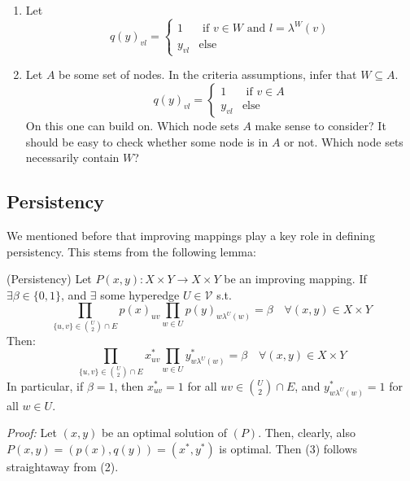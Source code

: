 \begin{enumerate}
\begin{enumerate}
        \item Let 
            \begin{equation} q(y)_{vl}= \begin{cases}
            1 & \text{ if } v \in W \text{ and } l=\lambda^W(v) \\
            y_{vl} & \text{else}
            \end{cases}
            \end{equation}
        
        \item Let $A$ be some set of nodes. In the criteria assumptions, infer that $W \subseteq A$. 
        \begin{equation} q(y)_{vl}= \begin{cases}
            1 & \text{ if } v \in A \\
            y_{vl} & \text{else}
            \end{cases}
            \end{equation}
        On this one can build on. Which node sets $A$ make sense to consider? It should be easy to check whether some node is in $A$ or not. Which node sets necessarily contain $W$? 
    \end{enumerate}
\end{enumerate}

\subsection{Persistency}
We mentioned before that improving mappings play a key role in defining persistency. This stems from the following lemma: 
\begin{lemma}{(Persistency)}
Let $P(x,y): X \times Y \to X \times Y$ be an improving mapping. If $\exists \beta \in \{0,1\}$, and $\exists$ some hyperedge $U \in \mathcal{V}$ s.t. 
\begin{equation}
    \prod_{\{u,v\} \in \binom{U}{2} \cap E} p(x)_{uv} \prod_{w \in U} p(y)_{w \lambda^U(w)}= \beta \quad \forall (x,y) \in X \times Y
\end{equation}
Then: 
\begin{equation}
    \prod_{\{u,v\} \in \binom{U}{2} \cap E} x^*_{uv} \prod_{w \in U} y^*_{w \lambda^U(w)}= \beta \quad \forall (x,y) \in X \times Y
\end{equation} In particular, if $\beta=1$, then $x^*_{uv}=1$ for all $uv \in \binom{U}{2} \cap E$, and $y^*_{w \lambda^U(w)}=1$ for all $w \in U$.  \end{lemma} \textit{Proof:} Let $(x,y)$ be an optimal solution of $(P)$. Then, clearly, also $P(x,y)=(p(x),q(y))=(x^*,y^*)$ is optimal. Then (3) follows straightaway from (2).
\\ \\ 

